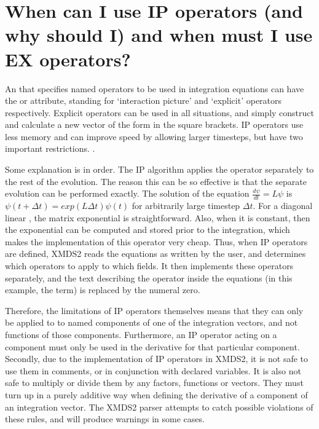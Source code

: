 \documentclass[letterpaper,10pt,english]{sphinxmanual}
\begin{document}
\ignorespaces 

\section{When can I use IP operators (and why should I) and when must I use EX operators?}
\label{\detokenize{faq:when-can-i-use-ip-operators-and-why-should-i-and-when-must-i-use-ex-operators}}\label{\detokenize{faq:index-5}}
\sphinxAtStartPar
An {\hyperref[\detokenize{reference_elements:operatornameselement}]{}} that specifies named operators to be used in integration equations can have the  or  attribute, standing for ‘interaction picture’ and ‘explicit’ operators respectively.  Explicit operators can be used in all situations, and simply construct and calculate a new vector of the form in the square brackets.  IP operators use less memory and can improve speed by allowing larger timesteps, but have two important restrictions.  .

\sphinxAtStartPar
Some explanation is in order.  The IP algorithm applies the operator separately to the rest of the evolution.  The reason this can be so effective is that the separate evolution can be performed exactly.  The solution of the equation \(\frac{d \psi}{dt} = L \psi\) is \(\psi(t+\Delta t) = exp(L \Delta t) \psi(t)\) for arbitrarily large timestep \(\Delta t\).  For a diagonal linear , the matrix exponential is straightforward.  Also, when it is constant, then the exponential can be computed and stored prior to the integration, which makes the implementation of this operator very cheap.  Thus, when IP operators are defined, XMDS2 reads the equations as written by the user, and determines which operators to apply to which fields.  It then implements these operators separately, and the text describing the operator inside the equations (in this example, the  term) is replaced by the numeral zero.

\sphinxAtStartPar
Therefore, the limitations of IP operators themselves means that they can only be applied to to named components of one of the integration vectors, and not functions of those components.  Furthermore, an IP operator acting on a component must only be used in the derivative for that particular component.  Secondly, due to the implementation of IP operators in XMDS2, it is not safe to use them in comments, or in conjunction with declared variables.  It is also not safe to multiply or divide them by any factors, functions or vectors.  They must turn up in a purely additive way when defining the derivative of a component of an integration vector.  The XMDS2 parser attempts to catch possible violations of these rules, and will produce warnings in some cases.
\end{document}
